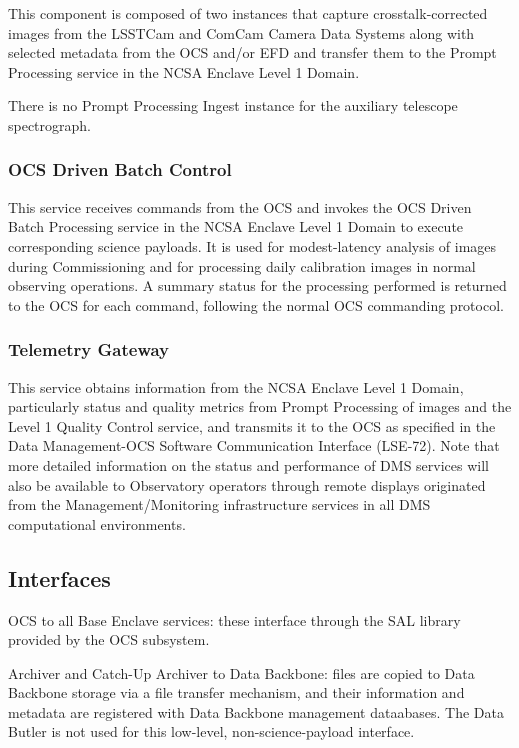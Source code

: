\documentclass[DM,lsstdraft,toc]{lsstdoc}
\begin{document}
This component is composed of two instances that capture
crosstalk-corrected images from the LSSTCam and ComCam Camera Data
Systems along with selected metadata from the OCS and/or EFD and
transfer them to the Prompt Processing service in the NCSA Enclave Level
1 Domain.

There is no Prompt Processing Ingest instance for the auxiliary
telescope spectrograph.

\subsubsection{OCS Driven Batch Control}\label{ocs-driven-batch-control}

This service receives commands from the OCS and invokes the OCS Driven
Batch Processing service in the NCSA Enclave Level 1 Domain to execute
corresponding science payloads. It is used for modest-latency analysis
of images during Commissioning and for processing daily calibration
images in normal observing operations. A summary status for the
processing performed is returned to the OCS for each command, following
the normal OCS commanding protocol.

\subsubsection{Telemetry Gateway}\label{telemetry-gateway}

This service obtains information from the NCSA Enclave Level 1 Domain,
particularly status and quality metrics from Prompt Processing of images
and the Level 1 Quality Control service, and transmits it to the OCS as
specified in the Data Management-OCS Software Communication Interface
(LSE-72). Note that more detailed information on the status and
performance of DMS services will also be available to Observatory
operators through remote displays originated from the
Management/Monitoring infrastructure services in all DMS computational
environments.

\subsection{Interfaces}\label{base-interfaces}

OCS to all Base Enclave services: these interface through the SAL
library provided by the OCS subsystem.

Archiver and Catch-Up Archiver to Data Backbone: files are copied to
Data Backbone storage via a file transfer mechanism, and their
information and metadata are registered with Data Backbone management
dataabases. The Data Butler is not used for this low-level,
non-science-payload interface.
\end{document}
